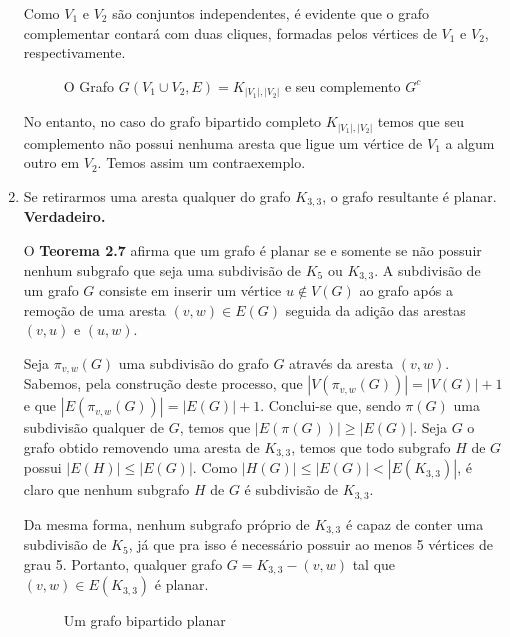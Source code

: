 \documentclass{homework}
\begin{document}
\begin{enumerate}[label=\textbf{\arabic*)}]
		Como $V_1$ e $V_2$ são conjuntos independentes, é evidente que o grafo complementar contará com duas cliques, formadas pelos vértices de $V_1$ e $V_2$, respectivamente. \par
		
		\begin{figure}[H]
			\centering
			
			\caption{O Grafo $G(V_1 \cup V_2, E) = K_{|V_1|, |V_2|}$ e seu complemento $G^{c}$}
			\label{fig:1.2.1}
		\end{figure}
		
		No entanto, no caso do grafo bipartido completo $K_{|V_1|, |V_2|}$ temos que seu complemento não possui nenhuma aresta que ligue um vértice de $V_1$ a algum outro em $V_2$. Temos assim um contraexemplo. \par
		
	\item Se retirarmos uma aresta qualquer do grafo $K_{3,3}$, o grafo resultante é planar. \textbf{Verdadeiro.} \par
	
	O \textbf{Teorema 2.7}\cite{jayme:18} afirma que um grafo é planar se e somente se não possuir nenhum subgrafo que seja uma subdivisão de $K_5$ ou $K_{3,3}$. A subdivisão de um grafo $G$ consiste em inserir um vértice $u \notin V(G)$ ao grafo após a remoção de uma aresta $(v, w) \in E(G)$ seguida da adição das arestas $(v, u)$ e $(u, w)$. \par
	
	Seja $\pi_{v, w}(G)$ uma subdivisão do grafo $G$ através da aresta $(v, w)$. Sabemos, pela construção deste processo, que $|V(\pi_{v, w}(G))| = |V(G)| + 1$ e que $|E(\pi_{v, w}(G))| = |E(G)| + 1$. Conclui-se que, sendo $\pi(G)$ uma subdivisão qualquer de $G$, temos que $|E(\pi(G))| \ge |E(G)|$. Seja $G$ o grafo obtido removendo uma aresta de $K_{3, 3}$, temos que todo subgrafo $H$ de $G$ possui $|E(H)| \le |E(G)|$. Como $|H(G)| \le |E(G)| < |E(K_{3, 3})|$, é claro que nenhum subgrafo $H$ de $G$ é subdivisão de $K_{3, 3}$. \par
	
	Da mesma forma, nenhum subgrafo próprio de $K_{3, 3}$ é capaz de conter uma subdivisão de $K_5$, já que pra isso é necessário possuir ao menos 5 vértices de grau 5. Portanto, qualquer grafo $G = K_{3, 3} - (v, w)$ tal que $(v, w) \in E(K_{3, 3})$ é planar. \par
	
	\begin{figure}[H]
		\centering
		
		\caption{Um grafo bipartido planar}
		\label{fig:1.3.1}
	\end{figure}
	

\end{enumerate}
\end{document}
